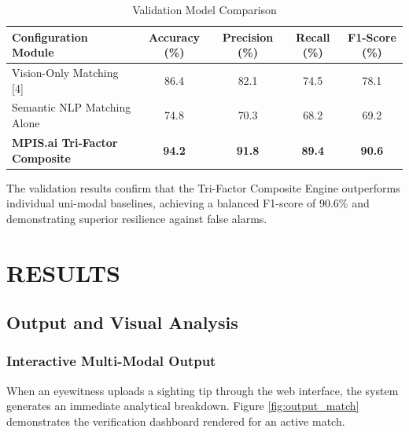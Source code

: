 \documentclass[12pt,a4paper]{report}
\begin{document}
\begin{table}[H]
\centering
\caption{Validation Model Comparison}
\label{tab:validation}
\begin{tabular}{lcccc}
\toprule
\textbf{Configuration Module} & \textbf{Accuracy (\%)} & \textbf{Precision (\%)} & \textbf{Recall (\%)} & \textbf{F1-Score (\%)} \\
\midrule
Vision-Only Matching [4] & 86.4 & 82.1 & 74.5 & 78.1 \\
Semantic NLP Matching Alone & 74.8 & 70.3 & 68.2 & 69.2 \\
\textbf{MPIS.ai Tri-Factor Composite} & \textbf{94.2} & \textbf{91.8} & \textbf{89.4} & \textbf{90.6} \\
\bottomrule
\end{tabular}
\end{table}

The validation results confirm that the Tri-Factor Composite Engine outperforms individual uni-modal baselines, achieving a balanced F1-score of 90.6\% and demonstrating superior resilience against false alarms.


\chapter{RESULTS}

\section{Output and Visual Analysis}

\subsection{Interactive Multi-Modal Output}
When an eyewitness uploads a sighting tip through the web interface, the system generates an immediate analytical breakdown. Figure \ref{fig:output_match} demonstrates the verification dashboard rendered for an active match.
\end{document}
